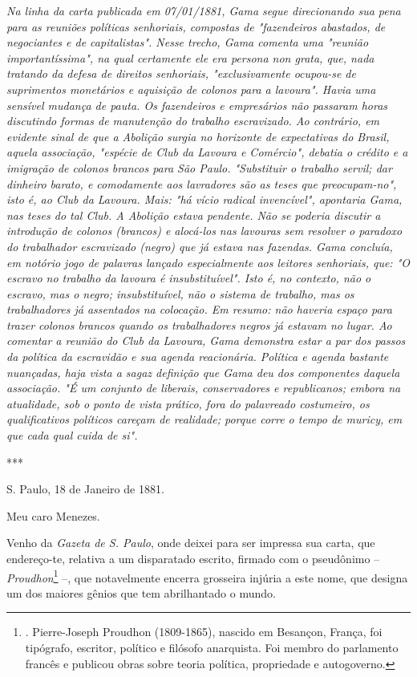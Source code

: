 \emph{Na linha da carta publicada em 07/01/1881, Gama segue direcionando
sua pena para as reuniões políticas senhoriais, compostas de
"fazendeiros abastados, de negociantes e de capitalistas". Nesse trecho,
Gama comenta uma "reunião importantíssima", na qual certamente ele era
persona non grata, que, nada tratando da defesa de direitos senhoriais,
"exclusivamente ocupou-se de suprimentos monetários e aquisição de
colonos para a lavoura". Havia uma sensível mudança de pauta. Os
fazendeiros e empresários não passaram horas discutindo formas de
manutenção do trabalho escravizado. Ao contrário, em evidente sinal de
que a Abolição surgia no horizonte de expectativas do Brasil, aquela
associação, "espécie de Club da Lavoura e Comércio", debatia o crédito e
a imigração de colonos brancos para São Paulo. "Substituir o trabalho
servil; dar dinheiro barato, e comodamente aos lavradores são as teses
que preocupam-no", isto é, ao Club da Lavoura. Mais: "há vício radical
invencível", apontaria Gama, nas teses do tal Club. A Abolição estava
pendente. Não se poderia discutir a introdução de colonos (brancos) e
alocá-los nas lavouras sem resolver o paradoxo do trabalhador
escravizado (negro) que já estava nas fazendas. Gama concluía, em
notório jogo de palavras lançado especialmente aos leitores senhoriais,
que: "O escravo no trabalho da lavoura é insubstituível". Isto é, no
contexto, não o escravo, mas o negro; insubstituível, não o sistema de
trabalho, mas os trabalhadores já assentados na colocação. Em resumo:
não haveria espaço para trazer colonos brancos quando os trabalhadores
negros já estavam no lugar. Ao comentar a reunião do Club da Lavoura,
Gama demonstra estar a par dos passos da política da escravidão e sua
agenda reacionária. Política e agenda bastante nuançadas, haja vista a
sagaz definição que Gama deu dos componentes daquela associação. "É um
conjunto de liberais, conservadores e republicanos; embora na
atualidade, sob o ponto de vista prático, fora do palavreado costumeiro,
os qualificativos políticos careçam de realidade; porque corre o tempo
de muricy, em que cada qual cuida de si".}

***

S. Paulo, 18 de Janeiro de 1881.

Meu caro Menezes.

Venho da \emph{Gazeta de S. Paulo}, onde deixei para ser impressa sua
carta, que endereço-te, relativa a um disparatado escrito, firmado com o
pseudônimo -- \emph{Proudhon}\footnote{. Pierre-Joseph Proudhon
  (1809-1865), nascido em Besançon, França, foi tipógrafo, escritor,
  político e filósofo anarquista. Foi membro do parlamento francês e
  publicou obras sobre teoria política, propriedade e autogoverno.} --,
que notavelmente encerra grosseira injúria a este nome, que designa um
dos maiores gênios que tem abrilhantado o mundo.

